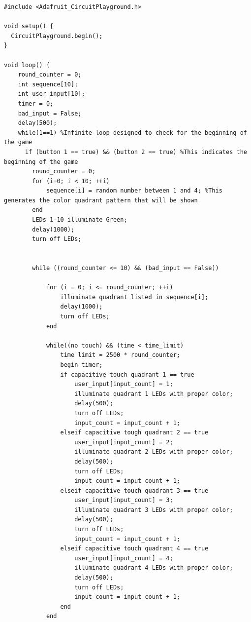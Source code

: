 \documentclass[12pt]{article}
\begin{document}
 \begin{lstlisting}[language=Arduino]
#include <Adafruit_CircuitPlayground.h>

void setup() {
  CircuitPlayground.begin();
}

void loop() {
    round_counter = 0;
    int sequence[10];
    int user_input[10];
    timer = 0;
    bad_input = False;
    delay(500);
    while(1==1) %Infinite loop designed to check for the beginning of the game
      if (button 1 == true) && (button 2 == true) %This indicates the beginning of the game
        round_counter = 0;
        for (i=0; i < 10; ++i)
            sequence[i] = random number between 1 and 4; %This generates the color quadrant pattern that will be shown
        end
        LEDs 1-10 illuminate Green;
        delay(1000);
        turn off LEDs;
        
        
        while ((round_counter <= 10) && (bad_input == False))
        
            for (i = 0; i <= round_counter; ++i)
                illuminate quadrant listed in sequence[i];
                delay(1000);
                turn off LEDs;
            end
            
            while((no touch) && (time < time_limit)
                time limit = 2500 * round_counter;
                begin timer;
                if capacitive touch quadrant 1 == true
                    user_input[input_count] = 1;
                    illuminate quadrant 1 LEDs with proper color;
                    delay(500);
                    turn off LEDs;
                    input_count = input_count + 1;
                elseif capacitive tough quadrant 2 == true
                    user_input[input_count] = 2;
                    illuminate quadrant 2 LEDs with proper color;
                    delay(500);
                    turn off LEDs;
                    input_count = input_count + 1;
                elseif capacitive touch quadrant 3 == true
                    user_input[input_count] = 3;
                    illuminate quadrant 3 LEDs with proper color;
                    delay(500);
                    turn off LEDs;
                    input_count = input_count + 1;
                elseif capacitive touch quadrant 4 == true
                    user_input[input_count] = 4;
                    illuminate quadrant 4 LEDs with proper color;
                    delay(500);
                    turn off LEDs;
                    input_count = input_count + 1;
                end
            end
            

\end{lstlisting}
\end{document}
